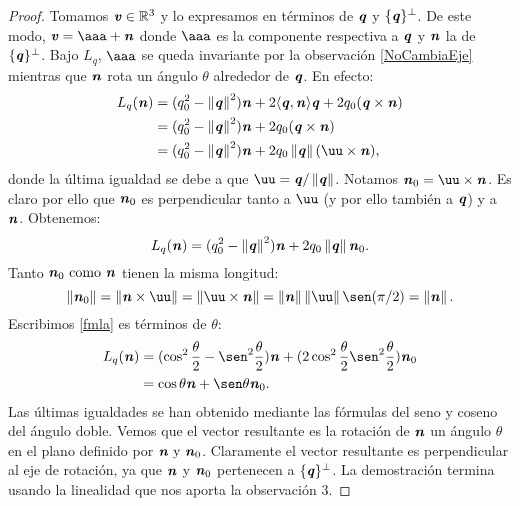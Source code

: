 \begin{proof}
Tomamos $ \textbf{\emph{v}} \in \mathbb{R}^3 $ y lo expresamos en términos de $ \textbf{\emph{q}} $ y $ \lbrace\textbf{\emph{q}} \rbrace^\perp $. De este modo, $ \vv = \aaa + \nn $ donde $ \aaa $ es la componente respectiva a $ \textbf{\emph{q}} $ y $ \textbf{\emph{n}} $ la de $ \lbrace\textbf{\emph{q}} \rbrace^\perp $. Bajo $ L_q $, $ \aaa $ se queda invariante por la observación \ref{NoCambiaEje} mientras que $ \textbf{\emph{n}} $ rota un ángulo $ \theta $ alrededor de $ \textbf{\emph{q}} $. En efecto:
\begin{equation*}
	\begin{split}
	L_q(\nn) &= (q_0^2-\norm{\qq}^2)\nn + 2\langle\qq , \nn\rangle\qq + 2q_0(\qq \times \nn)\\
		&= (q_0^2-\norm{\qq}^2)\nn + 2q_0(\qq \times \nn) \\
		&= (q_0^2-\norm{\qq}^2)\nn + 2q_0\norm{\qq}(\uu \times \nn),
			\end{split}
			\end{equation*} 	
			donde la última igualdad se debe a que $ \uu = \qq / \norm{\qq} $. Notamos $ \nn_0= \uu \times \nn$. Es claro por ello que $ \textbf{\emph{n}}_0 $ es perpendicular tanto a $ \uu $ (y por ello también a $ \textbf{\emph{q}} $) y a $ \textbf{\emph{n}} $. Obtenemos: 
			\begin{equation}\label{fmla}
				L_q(\textbf{\emph{n}}) =  (q_0^2-\left\Vert\textbf{\emph{q}}\right\Vert^2)\textbf{\emph{n}} + 2q_0\left\Vert\textbf{\emph{q}}\right\Vert\textbf{\emph{n}}_0.
			\end{equation} 
			Tanto $ \textbf{\emph{n}}_0 \text{ como }  \textbf{\emph{n}} $ tienen la misma longitud:
			\begin{equation*}
				\norm{\nn_0} = \norm{\nn \times \uu} = \norm{\uu \times \nn} = \norm{\nn}\norm{\uu}\sen(\pi/2) = \norm{\nn}.
			\end{equation*}
			Escribimos \ref{fmla} es términos de $ \theta $:
			\begin{equation*}
			\begin{split}
			L_q(\nn) &= (\cos^2\frac{\theta}{2} - \sen^2\frac{\theta}{2})\nn + (2\cos^2\frac{\theta}{2}\sen^2\frac{\theta}{2})\nn_0 \\
			&= \cos\theta\nn + \sen\theta\nn_0.
			\end{split}
			\end{equation*}
			Las últimas igualdades se han obtenido mediante las fórmulas del seno y coseno del ángulo doble. Vemos que el vector resultante es la rotación de $ \textbf{\emph{n}} $ un ángulo $ \theta $ en el plano definido por $ \textbf{\emph{n}} \text{ y } \textbf{\emph{n}}_0 $. Claramente el vector resultante es perpendicular al eje de rotación, ya que $ \textbf{\emph{n}}$ y $ \textbf{\emph{n}}_0 $ pertenecen a $ \lbrace \textbf{\emph{q}} \rbrace ^\perp$. La demostración termina usando la linealidad que nos aporta la observación 3.
		\end{proof}
	 	\bigskip
	 	
